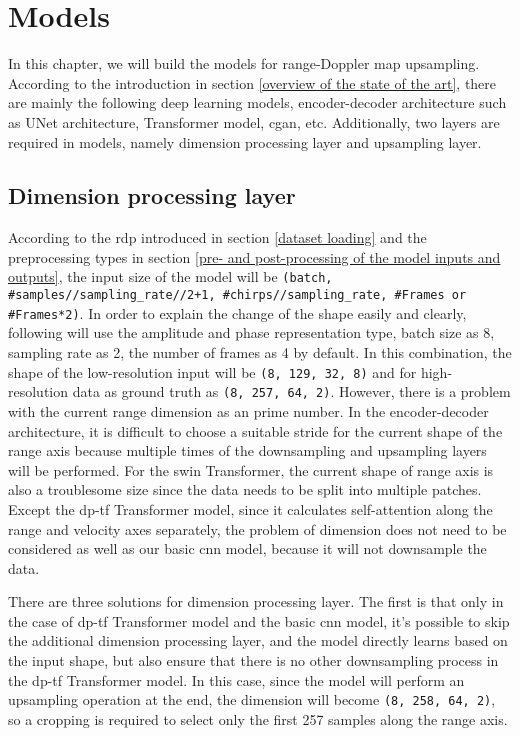 \chapter{Models} \label{models}

In this chapter, we will build the models for range-Doppler map upsampling. According to the introduction in section \ref{overview of the state of the art}, there are mainly the following deep learning models, encoder-decoder architecture such as UNet architecture, Transformer model, \gls{cgan}, etc. Additionally, two layers are required in models, namely dimension processing layer and upsampling layer.

\section{Dimension processing layer} \label{dimension processing layer}
According to the \gls{rdp} introduced in section \ref{dataset loading} and the preprocessing types in section \ref{pre- and post-processing of the model inputs and outputs}, the input size of the model will be \texttt{(batch, \#samples//sampling\_rate//2+1, \#chirps//sampling\_rate, \#Frames or \#Frames*2)}. In order to explain the change of the shape easily and clearly, following will use the amplitude and phase representation type, batch size as 8, sampling rate as 2, the number of frames as 4 by default. In this combination, the shape of the low-resolution input will be \texttt{(8, 129, 32, 8)} and for high-resolution data as ground truth as \texttt{(8, 257, 64, 2)}. However, there is a problem with the current range dimension as an prime number. In the encoder-decoder architecture, it is difficult to choose a suitable stride for the current shape of the range axis because multiple times of the downsampling and upsampling layers will be performed. For the \gls{swin} Transformer, the current shape of range axis is also a troublesome size since the data needs to be split into multiple patches. Except the \gls{dp}-\gls{tf} Transformer model, since it calculates self-attention along the range and velocity axes separately, the problem of dimension does not need to be considered as well as our basic \gls{cnn} model, because it will not downsample the data.

There are three solutions for dimension processing layer. The first is that only in the case of \gls{dp}-\gls{tf} Transformer model and the basic \gls{cnn} model, it's possible to skip the additional dimension processing layer, and the model directly learns based on the input shape, but also ensure that there is no other downsampling process in the \gls{dp}-\gls{tf} Transformer model. In this case, since the model will perform an upsampling operation at the end, the dimension will become \texttt{(8, 258, 64, 2)}, so a cropping is required to select only the first 257 samples along the range axis.

